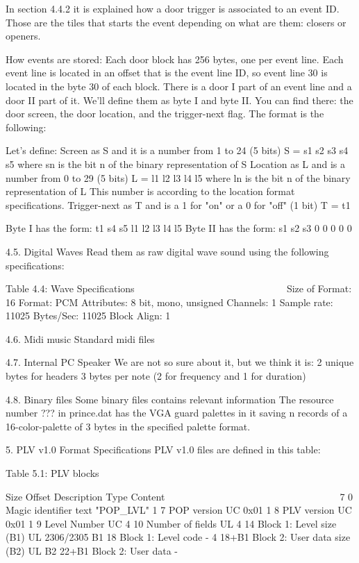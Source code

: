  In section 4.4.2 it is explained how a door trigger is associated to an
 event ID. Those are the tiles that starts the event depending on what are
 them: closers or openers.

 How events are stored:
 Each door block has 256 bytes, one per event line. Each event line is
 located in an offset that is the event line ID, so event line 30 is
 located in the byte 30 of each block.
 There is a door I part of an event line and a door II part of it. We'll
 define them as byte I and byte II.
 You can find there: the door screen, the door location, and the
 trigger-next flag. The format is the following:
 
 Let's define:
  Screen as S and it is a number from 1 to 24 (5 bits)
   S = s1 s2 s3 s4 s5
    where sn is the bit n of the binary representation of S
  Location as L and is a number from 0 to 29 (5 bits)
   L = l1 l2 l3 l4 l5
    where ln is the bit n of the binary representation of L
   This number is according to the location format specifications.
  Trigger-next as T and is a 1 for "on" or a 0 for "off" (1 bit)
   T = t1

 Byte I  has the form: t1 s4 s5 l1 l2 l3 l4 l5
 Byte II has the form: s1 s2 s3  0  0  0  0  0

4.5. Digital Waves
 Read them as raw digital wave sound using the following specifications:

                   Table 4.4: Wave Specifications
                   ~~~~~~~~~~~~~~~~~~~~~~~~~~~~~~
  Size of Format: 16
  Format: PCM
  Attributes: 8 bit, mono, unsigned
  Channels: 1
  Sample rate: 11025
  Bytes/Sec: 11025
  Block Align: 1
 
4.6. Midi music
 Standard midi files

4.7. Internal PC Speaker
 We are not so sure about it, but we think it is:
  2 unique bytes for headers
  3 bytes per note (2 for frequency and 1 for duration)
 
4.8. Binary files
 Some binary files contains relevant information
 The resource number ??? in prince.dat has the VGA guard palettes in it
 saving n records of a 16-color-palette of 3 bytes in the specified palette
 format.


5. PLV v1.0 Format Specifications
 PLV v1.0 files are defined in this table:

                   Table 5.1: PLV blocks
                   ~~~~~~~~~~~~~~~~~~~~~

   Size Offset Description                  Type   Content
   ~~~~ ~~~~~~ ~~~~~~~~~~~                  ~~~~   ~~~~~~~
      7      0 Magic identifier             text   "POP_LVL"
      1      7 POP version                  UC     0x01
      1      8 PLV version                  UC     0x01
      1      9 Level Number                 UC
      4     10 Number of fields             UL
      4     14 Block 1: Level size (B1)     UL     2306/2305
     B1     18 Block 1: Level code          -
      4  18+B1 Block 2: User data size (B2) UL
     B2  22+B1 Block 2: User data           -

